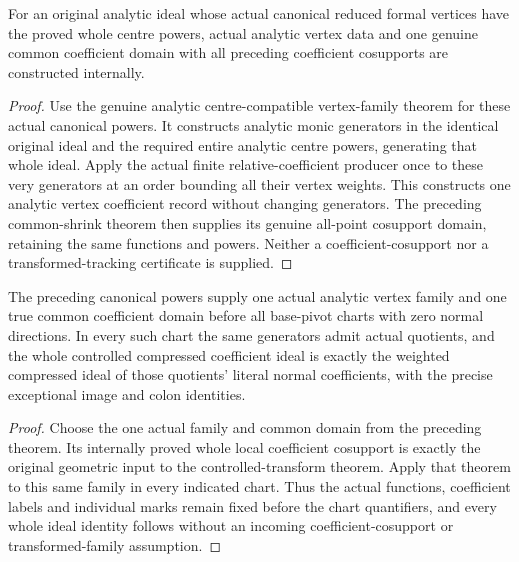 \begin{theorem}
\label{hir:actual-canonical-powers-coefficient-cosupport-domain}
\leanok
For an original analytic ideal whose actual canonical reduced formal vertices have the proved whole centre powers, actual analytic vertex data and one genuine common coefficient domain with all preceding coefficient cosupports are constructed internally.
\end{theorem}
\begin{proof}
Use the genuine analytic centre-compatible vertex-family theorem for these actual canonical powers. It constructs analytic monic generators in the identical original ideal and the required entire analytic centre powers, generating that whole ideal. Apply the actual finite relative-coefficient producer once to these very generators at an order bounding all their vertex weights. This constructs one analytic vertex coefficient record without changing generators. The preceding common-shrink theorem then supplies its genuine all-point cosupport domain, retaining the same functions and powers. Neither a coefficient-cosupport nor a transformed-tracking certificate is supplied.
\end{proof}

\begin{theorem}
\label{hir:actual-canonical-powers-controlled-coefficient-ideals}
\leanok
The preceding canonical powers supply one actual analytic vertex family and one true common coefficient domain before all base-pivot charts with zero normal directions. In every such chart the same generators admit actual quotients, and the whole controlled compressed coefficient ideal is exactly the weighted compressed ideal of those quotients' literal normal coefficients, with the precise exceptional image and colon identities.
\end{theorem}
\begin{proof}
Choose the one actual family and common domain from the preceding theorem. Its internally proved whole local coefficient cosupport is exactly the original geometric input to the controlled-transform theorem. Apply that theorem to this same family in every indicated chart. Thus the actual functions, coefficient labels and individual marks remain fixed before the chart quantifiers, and every whole ideal identity follows without an incoming coefficient-cosupport or transformed-family assumption.
\end{proof}
